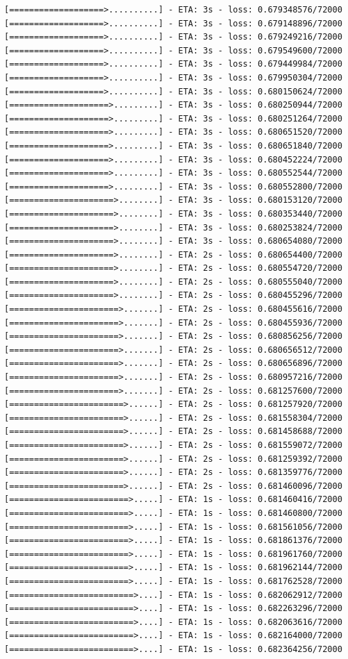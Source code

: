 \documentclass[12pt,fleqn]{article}\usepackage{../../common}
\begin{document}
\begin{verbatim}
[===================>..........] - ETA: 3s - loss: 0.679348576/72000 [===================>..........] - ETA: 3s - loss: 0.679148896/72000 [===================>..........] - ETA: 3s - loss: 0.679249216/72000 [===================>..........] - ETA: 3s - loss: 0.679549600/72000 [===================>..........] - ETA: 3s - loss: 0.679449984/72000 [===================>..........] - ETA: 3s - loss: 0.679950304/72000 [===================>..........] - ETA: 3s - loss: 0.680150624/72000 [====================>.........] - ETA: 3s - loss: 0.680250944/72000 [====================>.........] - ETA: 3s - loss: 0.680251264/72000 [====================>.........] - ETA: 3s - loss: 0.680651520/72000 [====================>.........] - ETA: 3s - loss: 0.680651840/72000 [====================>.........] - ETA: 3s - loss: 0.680452224/72000 [====================>.........] - ETA: 3s - loss: 0.680552544/72000 [====================>.........] - ETA: 3s - loss: 0.680552800/72000 [=====================>........] - ETA: 3s - loss: 0.680153120/72000 [=====================>........] - ETA: 3s - loss: 0.680353440/72000 [=====================>........] - ETA: 3s - loss: 0.680253824/72000 [=====================>........] - ETA: 3s - loss: 0.680654080/72000 [=====================>........] - ETA: 2s - loss: 0.680654400/72000 [=====================>........] - ETA: 2s - loss: 0.680554720/72000 [=====================>........] - ETA: 2s - loss: 0.680555040/72000 [=====================>........] - ETA: 2s - loss: 0.680455296/72000 [======================>.......] - ETA: 2s - loss: 0.680455616/72000 [======================>.......] - ETA: 2s - loss: 0.680455936/72000 [======================>.......] - ETA: 2s - loss: 0.680856256/72000 [======================>.......] - ETA: 2s - loss: 0.680656512/72000 [======================>.......] - ETA: 2s - loss: 0.680656896/72000 [======================>.......] - ETA: 2s - loss: 0.680957216/72000 [======================>.......] - ETA: 2s - loss: 0.681257600/72000 [=======================>......] - ETA: 2s - loss: 0.681257920/72000 [=======================>......] - ETA: 2s - loss: 0.681558304/72000 [=======================>......] - ETA: 2s - loss: 0.681458688/72000 [=======================>......] - ETA: 2s - loss: 0.681559072/72000 [=======================>......] - ETA: 2s - loss: 0.681259392/72000 [=======================>......] - ETA: 2s - loss: 0.681359776/72000 [=======================>......] - ETA: 2s - loss: 0.681460096/72000 [========================>.....] - ETA: 1s - loss: 0.681460416/72000 [========================>.....] - ETA: 1s - loss: 0.681460800/72000 [========================>.....] - ETA: 1s - loss: 0.681561056/72000 [========================>.....] - ETA: 1s - loss: 0.681861376/72000 [========================>.....] - ETA: 1s - loss: 0.681961760/72000 [========================>.....] - ETA: 1s - loss: 0.681962144/72000 [========================>.....] - ETA: 1s - loss: 0.681762528/72000 [=========================>....] - ETA: 1s - loss: 0.682062912/72000 [=========================>....] - ETA: 1s - loss: 0.682263296/72000 [=========================>....] - ETA: 1s - loss: 0.682063616/72000 [=========================>....] - ETA: 1s - loss: 0.682164000/72000 [=========================>....] - ETA: 1s - loss: 0.682364256/72000 
\end{verbatim}
\end{document}

